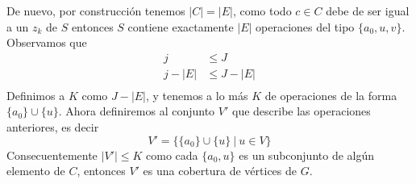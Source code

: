 \documentclass[spanish, xcolor=dvipsnames, aspectratio=169]{beamer}
\newcommand{\subsectiontitle}{}
\begin{document}
\begin{frame}{\subsectiontitle}
    De nuevo, por construcción tenemos \(|C| = |E|\), como todo \(c \in C\) debe de ser igual a un \(z_{k}\) de \(S\) entonces 
    \(S\) contiene exactamente \(|E|\) operaciones del tipo \(\{a_0, u, v\}\). Observamos que
    \begin{align*}
        j &\leq J \\
        j - |E| &\leq J - |E| \\
    \end{align*}
    Definimos a \(K\) como \(J - |E|\), y tenemos a lo más \(K\) de operaciones de la forma \(\{a_0\} \cup \{u\}\).
    \newline 
    Ahora definiremos al conjunto \(V'\) que describe las operaciones anteriores, es decir 
    \[
        V' = \{\{a_0\} \cup \{u\} \ | \ u \in V \}  
    \]
    Consecuentemente \(|V'| \leq K\) como cada \(\{a_0, u\}\) es un subconjunto de algún elemento de \(C\), entonces 
    \(V'\) es una cobertura de vértices de \(G\).
\end{frame}
\renewcommand{\subsectiontitle}{Ejemplificación de la transformación}
\end{document}
